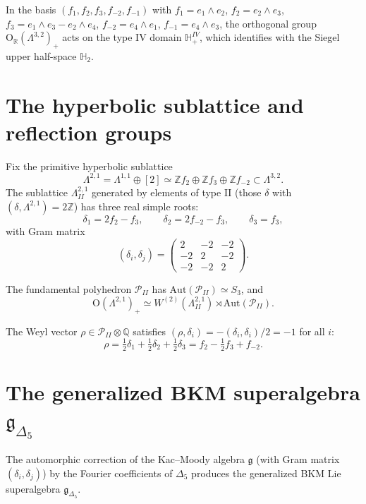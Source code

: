 In the basis $(f_1, f_2, f_3, f_{-2}, f_{-1})$ with $f_1 = e_1 \wedge e_2$, $f_2 = e_2 \wedge e_3$, $f_3 = e_1 \wedge e_3 - e_2 \wedge e_4$, $f_{-2} = e_4 \wedge e_1$, $f_{-1} = e_4 \wedge e_3$, the orthogonal group $\mathrm{O}_\mathbb{R}(\Lambda^{3,2})_+$ acts on the type IV domain $\mathbb{H}^{IV}_+$, which identifies with the Siegel upper half-space $\mathbb{H}_2$.

\section{The hyperbolic sublattice and reflection groups}
\label{sec:k3e-reflections}

Fix the primitive hyperbolic sublattice
\[
 \Lambda^{2,1} = \Lambda^{1,1} \oplus [2] \simeq \mathbb{Z}f_2 \oplus \mathbb{Z}f_3 \oplus \mathbb{Z}f_{-2} \subset \Lambda^{3,2}.
\]
The sublattice $\Lambda^{2,1}_{II}$ generated by elements of type II (those $\delta$ with $(\delta, \Lambda^{2,1}) = 2\mathbb{Z}$) has three real simple roots:
\[
 \delta_1 = 2f_2 - f_3, \qquad \delta_2 = 2f_{-2} - f_3, \qquad \delta_3 = f_3,
\]
with Gram matrix
\[
 (\delta_i, \delta_j) = \begin{pmatrix} 2 & -2 & -2 \\ -2 & 2 & -2 \\ -2 & -2 & 2 \end{pmatrix}.
\]

The fundamental polyhedron $\mathcal{P}_{II}$ has $\mathrm{Aut}(\mathcal{P}_{II}) \simeq S_3$, and
\[
 \mathrm{O}(\Lambda^{2,1})_+ \simeq W^{(2)}(\Lambda^{2,1}_{II}) \rtimes \mathrm{Aut}(\mathcal{P}_{II}).
\]

\begin{definition}
\label{def:k3e-weyl-vector}
The Weyl vector $\rho \in \mathcal{P}_{II} \otimes \mathbb{Q}$ satisfies $(\rho, \delta_i) = -(\delta_i, \delta_i)/2 = -1$ for all $i$:
\[
 \rho = \tfrac{1}{2}\delta_1 + \tfrac{1}{2}\delta_2 + \tfrac{1}{2}\delta_3 = f_2 - \tfrac{1}{2}f_3 + f_{-2}.
\]
\end{definition}

\section{The generalized BKM superalgebra \texorpdfstring{$\mathfrak{g}_{\Delta_5}$}{g-Delta-5}}
\label{sec:k3e-bkm}

The automorphic correction of the Kac--Moody algebra $\mathfrak{g}$ (with Gram matrix $(\delta_i, \delta_j)$) by the Fourier coefficients of $\Delta_5$ produces the generalized BKM Lie superalgebra $\mathfrak{g}_{\Delta_5}$.

